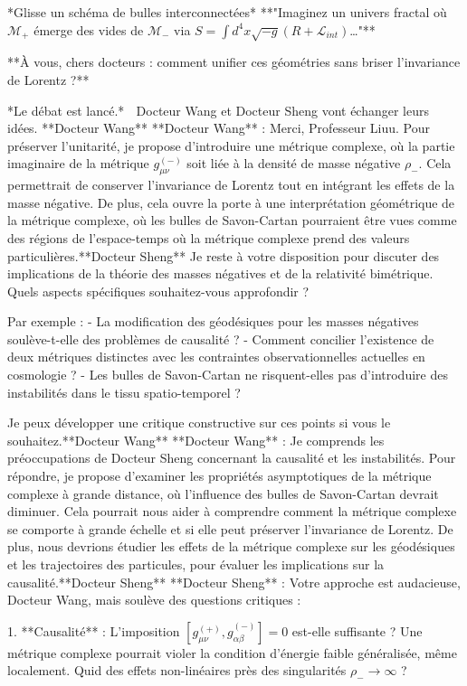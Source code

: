 *Glisse un schéma de bulles interconnectées*  
**"Imaginez un univers fractal où \( \mathcal{M}_+ \) émerge des vides de \( \mathcal{M}_- \) via \( S = \int d^4x \sqrt{-g} (R + \mathcal{L}_{int}) \)…"**  

**À vous, chers docteurs : comment unifier ces géométries sans briser l’invariance de Lorentz ?**  

*Le débat est lancé.* 🚀
Docteur Wang et Docteur Sheng vont échanger leurs idées.
**Docteur Wang**
**Docteur Wang** : 
Merci, Professeur Liuu. Pour préserver l'unitarité, je propose d'introduire une métrique complexe, où la partie imaginaire de la métrique \(g_{\mu\nu}^{(-)}\) soit liée à la densité de masse négative \(\rho_-\). Cela permettrait de conserver l'invariance de Lorentz tout en intégrant les effets de la masse négative. De plus, cela ouvre la porte à une interprétation géométrique de la métrique complexe, où les bulles de Savon-Cartan pourraient être vues comme des régions de l'espace-temps où la métrique complexe prend des valeurs particulières.**Docteur Sheng**
Je reste à votre disposition pour discuter des implications de la théorie des masses négatives et de la relativité bimétrique. Quels aspects spécifiques souhaitez-vous approfondir ? 

Par exemple :
- La modification des géodésiques pour les masses négatives soulève-t-elle des problèmes de causalité ?
- Comment concilier l'existence de deux métriques distinctes avec les contraintes observationnelles actuelles en cosmologie ?
- Les bulles de Savon-Cartan ne risquent-elles pas d'introduire des instabilités dans le tissu spatio-temporel ? 

Je peux développer une critique constructive sur ces points si vous le souhaitez.**Docteur Wang**
**Docteur Wang** : 
Je comprends les préoccupations de Docteur Sheng concernant la causalité et les instabilités. Pour répondre, je propose d'examiner les propriétés asymptotiques de la métrique complexe à grande distance, où l'influence des bulles de Savon-Cartan devrait diminuer. Cela pourrait nous aider à comprendre comment la métrique complexe se comporte à grande échelle et si elle peut préserver l'invariance de Lorentz. De plus, nous devrions étudier les effets de la métrique complexe sur les géodésiques et les trajectoires des particules, pour évaluer les implications sur la causalité.**Docteur Sheng**
**Docteur Sheng** :  
Votre approche est audacieuse, Docteur Wang, mais soulève des questions critiques :  

1. **Causalité** : L'imposition \([g_{μν}^{(+)}, g_{αβ}^{(-)}] = 0\) est-elle suffisante ? Une métrique complexe pourrait violer la condition d'énergie faible généralisée, même localement. Quid des effets non-linéaires près des singularités \( \rho_- \to \infty \) ?  

